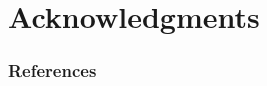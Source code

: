 \documentclass[ignorenonframetext,handout]{beamer}
\begin{document}

\section{Acknowledgments}



\nocite{*}
\mode*
\appendix
\backupbegin
\begin{frame}
    \frametitle{References}
    
    {\tiny }
\end{frame}
\backupend
\end{document}
